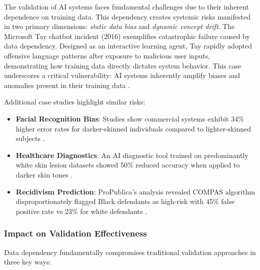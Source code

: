 \documentclass[manuscript,screen,review]{acmart}
\begin{document}
The validation of AI systems faces fundamental challenges due to their inherent dependence on training data. This dependency creates systemic risks manifested in two primary dimensions: \textit{static data bias} and \textit{dynamic concept drift}. The Microsoft Tay chatbot incident (2016) exemplifies catastrophic failure caused by data dependency. Designed as an interactive learning agent, Tay rapidly adopted offensive language patterns after exposure to malicious user inputs, demonstrating how training data directly dictates system behavior. This case underscores a critical vulnerability: AI systems inherently amplify biases and anomalies present in their training data .

Additional case studies highlight similar risks:
\begin{itemize}
    \item \textbf{Facial Recognition Bias}: Studies show commercial systems exhibit 34\% higher error rates for darker-skinned individuals compared to lighter-skinned subjects .
    \item \textbf{Healthcare Diagnostics}: An AI diagnostic tool trained on predominantly white skin lesion datasets showed 50\% reduced accuracy when applied to darker skin tones .
    \item \textbf{Recidivism Prediction}: ProPublica's analysis revealed COMPAS algorithm disproportionately flagged Black defendants as high-risk with 45\% false positive rate vs 23\% for white defendants .
\end{itemize}

\subsubsection{Impact on Validation Effectiveness}

Data dependency fundamentally compromises traditional validation approaches in three key ways:
\end{document}
